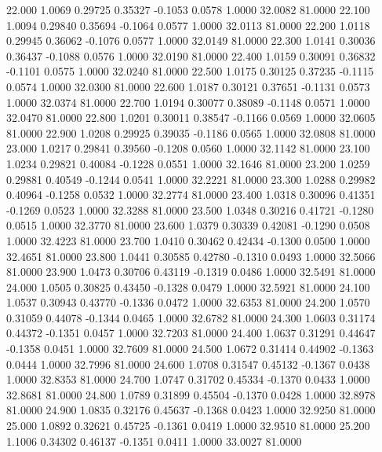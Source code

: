   22.000   1.0069   0.29725   0.35327  -0.1053   0.0578   1.0000  32.0082  81.0000
  22.100   1.0094   0.29840   0.35694  -0.1064   0.0577   1.0000  32.0113  81.0000
  22.200   1.0118   0.29945   0.36062  -0.1076   0.0577   1.0000  32.0149  81.0000
  22.300   1.0141   0.30036   0.36437  -0.1088   0.0576   1.0000  32.0190  81.0000
  22.400   1.0159   0.30091   0.36832  -0.1101   0.0575   1.0000  32.0240  81.0000
  22.500   1.0175   0.30125   0.37235  -0.1115   0.0574   1.0000  32.0300  81.0000
  22.600   1.0187   0.30121   0.37651  -0.1131   0.0573   1.0000  32.0374  81.0000
  22.700   1.0194   0.30077   0.38089  -0.1148   0.0571   1.0000  32.0470  81.0000
  22.800   1.0201   0.30011   0.38547  -0.1166   0.0569   1.0000  32.0605  81.0000
  22.900   1.0208   0.29925   0.39035  -0.1186   0.0565   1.0000  32.0808  81.0000
  23.000   1.0217   0.29841   0.39560  -0.1208   0.0560   1.0000  32.1142  81.0000
  23.100   1.0234   0.29821   0.40084  -0.1228   0.0551   1.0000  32.1646  81.0000
  23.200   1.0259   0.29881   0.40549  -0.1244   0.0541   1.0000  32.2221  81.0000
  23.300   1.0288   0.29982   0.40964  -0.1258   0.0532   1.0000  32.2774  81.0000
  23.400   1.0318   0.30096   0.41351  -0.1269   0.0523   1.0000  32.3288  81.0000
  23.500   1.0348   0.30216   0.41721  -0.1280   0.0515   1.0000  32.3770  81.0000
  23.600   1.0379   0.30339   0.42081  -0.1290   0.0508   1.0000  32.4223  81.0000
  23.700   1.0410   0.30462   0.42434  -0.1300   0.0500   1.0000  32.4651  81.0000
  23.800   1.0441   0.30585   0.42780  -0.1310   0.0493   1.0000  32.5066  81.0000
  23.900   1.0473   0.30706   0.43119  -0.1319   0.0486   1.0000  32.5491  81.0000
  24.000   1.0505   0.30825   0.43450  -0.1328   0.0479   1.0000  32.5921  81.0000
  24.100   1.0537   0.30943   0.43770  -0.1336   0.0472   1.0000  32.6353  81.0000
  24.200   1.0570   0.31059   0.44078  -0.1344   0.0465   1.0000  32.6782  81.0000
  24.300   1.0603   0.31174   0.44372  -0.1351   0.0457   1.0000  32.7203  81.0000
  24.400   1.0637   0.31291   0.44647  -0.1358   0.0451   1.0000  32.7609  81.0000
  24.500   1.0672   0.31414   0.44902  -0.1363   0.0444   1.0000  32.7996  81.0000
  24.600   1.0708   0.31547   0.45132  -0.1367   0.0438   1.0000  32.8353  81.0000
  24.700   1.0747   0.31702   0.45334  -0.1370   0.0433   1.0000  32.8681  81.0000
  24.800   1.0789   0.31899   0.45504  -0.1370   0.0428   1.0000  32.8978  81.0000
  24.900   1.0835   0.32176   0.45637  -0.1368   0.0423   1.0000  32.9250  81.0000
  25.000   1.0892   0.32621   0.45725  -0.1361   0.0419   1.0000  32.9510  81.0000
  25.200   1.1006   0.34302   0.46137  -0.1351   0.0411   1.0000  33.0027  81.0000
